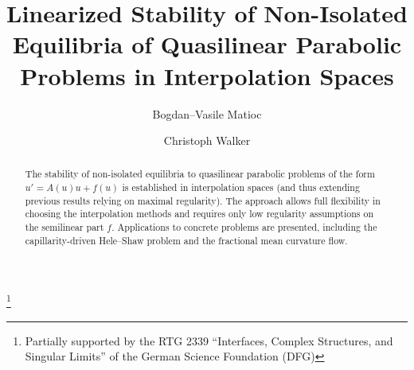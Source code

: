 \documentclass[reqno,11pt]{amsart}
\numberwithin{equation}{section}
\theoremstyle{remark}
\begin{document}

\title[Linearized Stability of Non-Isolated Equilibria]{Linearized Stability of Non-Isolated Equilibria of Quasilinear Parabolic Problems in Interpolation Spaces}

\author{Bogdan--Vasile Matioc}
\address{Fakult\"at f\"ur Mathematik, Universit\"at Regensburg,   93053 Regensburg, Deutschland.}

\author{Christoph Walker}
\address{Leibniz Universit\"at Hannover\\
Institut f\"ur Angewandte Mathematik\\
Welfengarten 1\\
30167 Hannover\\
Germany}


\thanks{Partially supported by the RTG 2339
 ``Interfaces, Complex Structures, and Singular Limits'' of the German Science Foundation (DFG)}


\begin{abstract}
The stability of non-isolated equilibria to
 quasilinear parabolic problems of the form
$u' = A(u)u + f(u)$ is established in interpolation spaces (and thus extending previous results relying on maximal regularity). The approach allows full flexibility in choosing the interpolation methods  and requires only low regularity assumptions on the semilinear part $f$. Applications to concrete problems are presented, including the capillarity-driven Hele--Shaw problem and the fractional mean curvature flow.
\end{abstract}



\maketitle

\pagestyle{myheadings}


 
 
\end{document}
